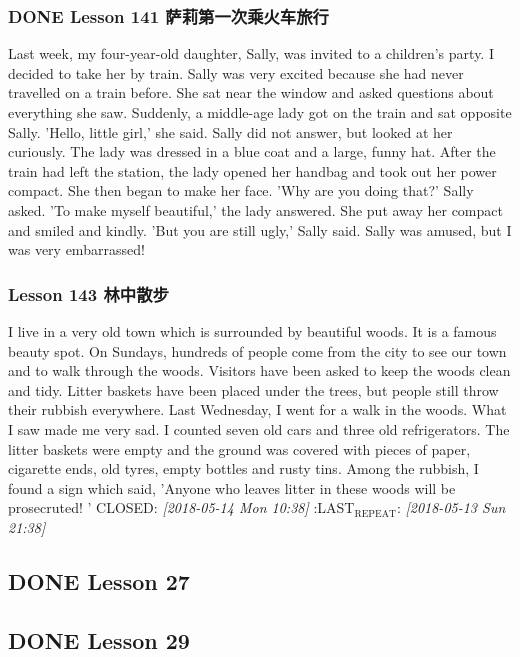 \documentclass[11pt]{ctexart}
\begin{document}
\subsubsection{{\bfseries\sffamily DONE} Lesson 141 萨莉第一次乘火车旅行}
\label{sec:orga1e4081}
Last week, my four-year-old daughter, Sally, was invited to a children's party.
I decided to take her by train.
Sally was very excited because she had never travelled on a train before.
She sat near the window and asked questions about everything she saw.
Suddenly, a middle-age lady got on the train and sat opposite Sally.
'Hello, little girl,' she said.
Sally did not answer, but looked at her curiously.
The lady was dressed in a blue coat and a large, funny hat.
After the train had left the station, the lady opened her handbag and took out her power compact.
She then began to make her face.
'Why are you doing that?' Sally asked.
'To make myself beautiful,' the lady answered.
She put away her compact and smiled and kindly.
'But you are still ugly,' Sally said.
Sally was amused, but I was very embarrassed!
\subsubsection{Lesson 143 林中散步}
\label{sec:org1914471}
I live in a very old town which is surrounded by beautiful woods.
It is a famous beauty spot.
On Sundays, hundreds of people come from the city to see our town and to walk through the woods.
Visitors have been asked to keep the woods clean and tidy.
Litter baskets have been placed under the trees,
but people still throw their rubbish everywhere.
Last Wednesday, I went for a walk in the woods.
What I saw made me very sad.
I counted seven old cars and three old refrigerators.
The litter baskets were empty and the ground was covered with pieces of paper, cigarette ends, old tyres, empty bottles and rusty tins.
Among the rubbish, I found a sign which said, 'Anyone who leaves litter in these woods will be prosecruted!
'
  CLOSED: \textit{[2018-05-14 Mon 10:38]}
:LAST\(_{\text{REPEAT}}\): \textit{[2018-05-13 Sun 21:38]}
\subsection{{\bfseries\sffamily DONE} Lesson 27}
\label{sec:orgb8b2588}
\subsection{{\bfseries\sffamily DONE} Lesson 29}
\label{sec:org580a953}
\end{document}
